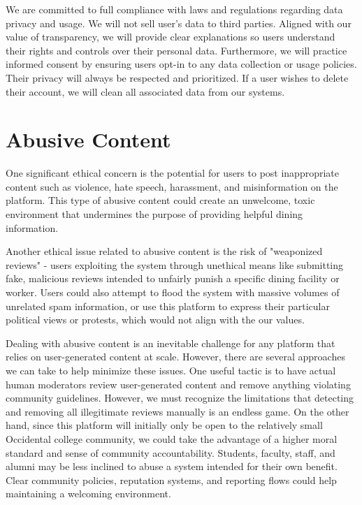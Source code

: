 \documentclass[10pt,twocolumn]{article}
\begin{document}
We are committed to full compliance with laws and regulations regarding data privacy and usage. We will not sell user's data to third parties.  Aligned with our value of transparency, we will provide clear explanations so users understand their rights and controls over their personal data. Furthermore, we will practice informed consent by ensuring users opt-in to any data collection or usage policies. Their privacy will always be respected and prioritized. If a user wishes to delete their account, we will clean all associated data from our systems.



\section{Abusive Content}
One significant ethical concern is the potential for users to post inappropriate content such as violence, hate speech, harassment, and misinformation on the platform. This type of abusive content could create an unwelcome, toxic environment that undermines the purpose of providing helpful dining information. 

Another ethical issue related to abusive content is the risk of "weaponized reviews" - users exploiting the system through unethical means like submitting fake, malicious reviews intended to unfairly punish a specific dining facility or worker. Users could also attempt to flood the system with massive volumes of unrelated spam information, or use this platform to express their particular political views or protests, which would not align with the our values.

Dealing with abusive content is an inevitable challenge for any platform that relies on user-generated content at scale. However, there are several approaches we can take to help minimize these issues. One useful tactic is to have actual human moderators review user-generated content and remove anything violating community guidelines. However, we must recognize the limitations that detecting and removing all illegitimate reviews manually is an endless game. On the other hand, since this platform will initially only be open to the relatively small Occidental college community, we could take the advantage of a higher moral standard and sense of community accountability. Students, faculty, staff, and alumni may be less inclined to abuse a system intended for their own benefit. Clear community policies, reputation systems, and reporting flows could help maintaining a welcoming environment.
\end{document}
